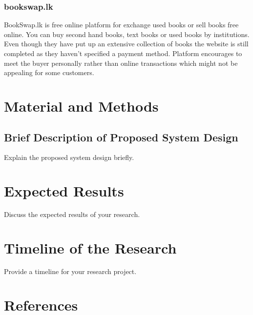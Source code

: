 \documentclass{article}
\begin{document}
\subsubsection{bookswap.lk}
BookSwap.lk is free online platform for exchange used books or sell books free online. You can buy second hand books, text books or used books by institutions. Even though they have put up an extensive collection of books the website is still completed as they haven't specified a payment method. Platform encourages to meet the buyer personally rather than online transactions which might not be appealing for some customers. 

\newpage
\section{Material and Methods}
\subsection{Brief Description of Proposed System Design}
Explain the proposed system design briefly.

\newpage
\section{Expected Results}
Discuss the expected results of your research.

\newpage
\section{Timeline of the Research}
Provide a timeline for your research project.

\newpage
\section{References}
\begin{thebibliography}{9}
\end{thebibliography}
\end{document}
